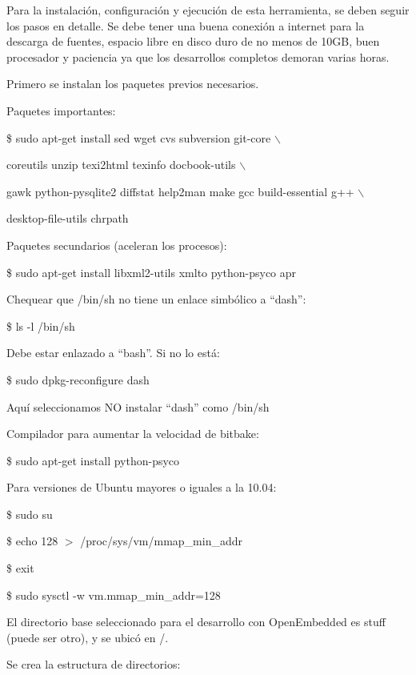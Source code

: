 Para la instalación, configuración y ejecución de esta herramienta, se deben seguir los pasos en detalle. Se debe tener una buena conexión a internet para la descarga de fuentes, espacio libre en disco duro de no menos de 10GB, buen procesador y paciencia ya que los desarrollos completos demoran varias horas.

\bigskip
Primero se instalan los paquetes previos necesarios. 

\newpage
Paquetes importantes:

\bigskip
\centerline{\$ sudo apt-get install sed wget cvs subversion git-core $\backslash$}

\centerline{coreutils unzip texi2html texinfo docbook-utils $\backslash$}

\centerline{gawk python-pysqlite2 diffstat help2man make gcc build-essential g++ $\backslash$}

\centerline{desktop-file-utils chrpath}

\bigskip
Paquetes secundarios (aceleran los procesos):

\bigskip
\centerline{\$ sudo apt-get install libxml2-utils xmlto python-psyco apr}

\bigskip
Chequear que /bin/sh no tiene un enlace simbólico a “dash”:

\bigskip
\centerline{\$ ls -l /bin/sh}

\bigskip
Debe estar enlazado a “bash”. Si no lo está:

\bigskip
\centerline{\$ sudo dpkg-reconfigure dash}

\bigskip
Aquí seleccionamos NO instalar “dash” como /bin/sh

\bigskip
Compilador para aumentar la velocidad de bitbake:

\bigskip
\centerline{\$ sudo apt-get install python-psyco}

\bigskip
Para versiones de Ubuntu mayores o iguales a la 10.04:

\bigskip
\centerline{\$ sudo su}

\centerline{\$ echo 128 $>$ /proc/sys/vm/mmap\_min\_addr}

\centerline{\$ exit}

\centerline{\$ sudo sysctl -w vm.mmap\_min\_addr=128}



\bigskip
El directorio base seleccionado para el desarrollo con OpenEmbedded es stuff (puede ser otro), y se ubicó en /.

\bigskip
Se crea la estructura de directorios:

